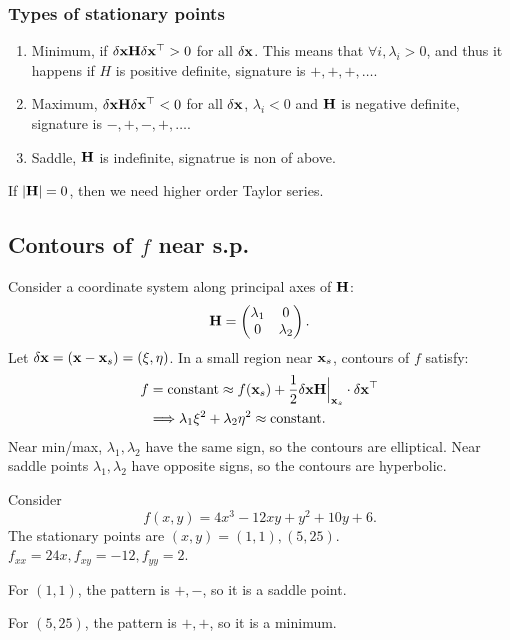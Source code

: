 \documentclass[10pt]{article}
\begin{document}
      \subsubsection*{Types of stationary points}
      \begin{enumerate}
          \item Minimum, if $\delta{\bf x} {\bf H} \delta{\bf x}^{\top}>0$ for all $ \delta{\bf x} $. This means that $ \forall i, \lambda_i>0 $, and thus it happens if $H$ is positive definite, signature is $+,+,+,\dots$.
          \item Maximum, $\delta{\bf x} {\bf H} \delta{\bf x}^{\top}<0$ for all $\delta{\bf x}$, $ \lambda_i<0 $ and ${\bf H}$ is negative definite, signature is $-,+,-,+,\dots$.
          \item Saddle, ${\bf H}$ is indefinite, signatrue is non of above.
      \end{enumerate}
      \begin{remark}
          If $|{\bf H}|=0$, then we need higher order Taylor series. 
      \end{remark}
      \subsection{Contours of $f$ near s.p.}
      Consider a coordinate system along principal axes of ${\bf H}$:
      \[
          {\bf H}=\begin{pmatrix}
              \lambda_1&0\\
              0&\lambda_2
          \end{pmatrix}.
      \]
      Let $ \delta{\bf x}= ({\bf x}-{\bf x}_s)=(\xi,\eta) $. In a small region near ${\bf x}_s$, contours of $f$ satisfy:
      \begin{align*}
        f&=\text{constant} \approx f({\bf x}_s)+\frac{1}{2}\delta{\bf x} {\bf H}\Big|_{{\bf x}_s}\cdot \delta{\bf x}^{\top}\\
        & \Longrightarrow \lambda_1 \xi^2+\lambda_2 \eta^2 \approx \text{constant}.
      \end{align*}
      Near min/max, $ \lambda_1,\lambda_2 $ have the same sign, so the contours are elliptical. Near saddle points $ \lambda_1,\lambda_2 $ have opposite signs, so the contours are hyperbolic.
      \begin{example}
          Consider 
          \[
              f(x,y)=4x^3-12xy+y^2+10y+6.
          \]
          The stationary points are $(x,y)=(1,1), (5,25)$. $f_{xx}=24x, f_{xy}=-12, f_{yy}=2$.

          For $(1,1)$, the pattern is $+,-$, so it is a saddle point.

          For $(5,25)$, the pattern is $+,+$, so it is a minimum.
      \end{example}
\end{document}
